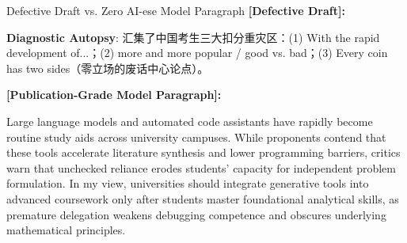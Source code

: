 \begin{ExampleBox}{Defective Draft vs. Zero AI-ese Model Paragraph}
\textbf{\color{TargetHighlight}[Defective Draft]:}\par
{}\par\vspace{4pt}
\textbf{Diagnostic Autopsy}: 汇集了中国考生三大扣分重灾区：(1)  With the rapid development of...；(2)  more and more popular / good vs. bad；(3)  Every coin has two sides（零立场的废话中心论点）。\par\vspace{6pt}
\textbf{\color{AcadNavy}[Publication-Grade Model Paragraph]:}\par
Large language models and automated code assistants have rapidly become routine study aids across university campuses. While proponents contend that these tools accelerate literature synthesis and lower programming barriers, critics warn that unchecked reliance erodes students' capacity for independent problem formulation. In my view, universities should integrate generative tools into advanced coursework only after students master foundational analytical skills, as premature delegation weakens debugging competence and obscures underlying mathematical principles.
\end{ExampleBox}
